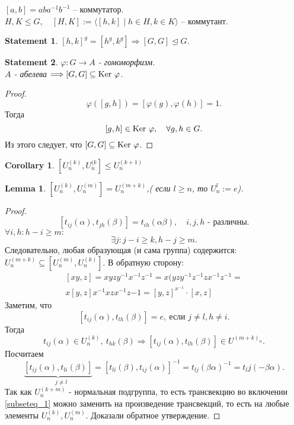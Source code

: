 \documentclass[11pt]{book}
\newcommand{\ke}{{\mathop{\text{\rm Ker}}}~}
\theoremstyle{definition}
\theoremstyle{plain}
\theoremstyle{plain}
\newtheorem*{lm}{Lemma}
\newtheorem*{st}{Statement}
\theoremstyle{definition}
\newtheorem*{cor}{Corollary}
\theoremstyle{remark}
\begin{document}
\begin{defn}
    $[a, b] = aba^{-1}b^{-1}$ -- коммутатор.\\
    $H, K \le G, \quad [H, K]:= \langle [h, k] \mid h \in  H, k \in  K \rangle$ -- коммутант.
\end{defn}
\begin{st}
    $[h, k]^g = [h^g, k^g] \Rightarrow [G, G] \trianglelefteq G$.
\end{st}
\begin{st}
    $\varphi : G \to  A$ - гомоморфизм. \\
    $A$ - абелева $\Longrightarrow [G, G] \subseteq \ke \varphi $.
\end{st}
\begin{proof}
    \[
	\varphi ([g, h]) = [\varphi (g), \varphi (h)] = 1 
    .\] 
    Тогда \[
	[g, h] \in  \ke \varphi , \quad \forall g, h \in  G
    .\] 
    Из этого следует, что $[G, G] \subseteq  \ke \varphi $.
\end{proof}
\begin{cor}
    $[U_n^{(k)}, U_n^{(k}] \le U^{(k+1)}_n $
\end{cor}
\begin{lm}
    $[U_n^{(k)}, U_n^{(m)}] = U_n^{(m+k)}$,( если $l \ge n 	$, то $U^l_n := {e}$).
\end{lm}
\begin{proof}
\[
    [t_{ij}(\alpha ), t_{jh} (\beta )] = t_{ih} (\alpha \beta), \quad i, j, h \mbox{ - различны} 
.\]     
$\forall i, h : h - i \ge  m:$
\[
\exists j: j-i \ge k, h -j \ge m
.\] 
Следовательно, любая образующая (и сама группа) содержится: $U_n^{(m+k)}\subseteq [U_n^{(m)}, U_n^{(k)}] \label{subseteq_1}$.
В обратную сторону:
$$
\begin{array}{c}
[xy, z] = xyzy^{-1}x^{-1}z^{-1} = x (yzy^{-1}z^{-1}z x^{-1} z^{-1} =\\
x [y, z] x^{-1} x z x^{-1} z{-1} = [y, z]^{x^{-1}} \cdot [x, z]
\end{array}
$$
Заметим, что \[
    [t_{ij}(\alpha ) , t_{lh}(\beta )] = e, ~\mbox{если }j \ne l, h \ne i
.\] 
Тогда
\[
    t_{ij}(\alpha ) \in  U^{(k)}_n , ~ t_{hk}(\beta ) \Longrightarrow [t_{ij}(\alpha ), t_{lh}(\beta )] \in U^{(m+k)_n}
.\] 
Посчитаем 
\[
    \underbrace{[t_{ij}(\alpha ), t_{li}(\beta )] }_{\quad j \ne l } = [t_{li} (\beta), t_{ij} (\alpha ) ]^{-1} = t_{lj} (\beta \alpha )^{-1} = t_lj (-\beta \alpha ) 
.\] 
Так как $U_n^{(k+m)}$ - нормальная подгруппа, то есть трансвекцию во включении \ref{subseteq_1} можно заменить на произведение трансвекций, то есть на любые элементы $U_n^{(k)}, U_n^{(m)}$. Доказали обратное утверждение.
\end{proof}
\end{document}

